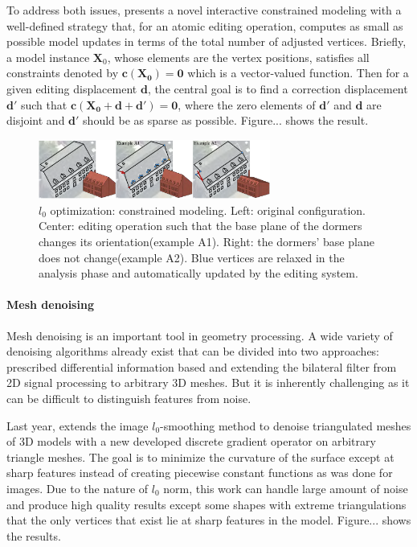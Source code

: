 To address both issues, \cite{habbecke2012linear} presents a novel interactive constrained modeling with a well-defined strategy that, for an atomic editing operation, computes as small as possible model updates in terms of the total number of adjusted vertices. Briefly, a model instance $\mathbf{X}_0$, whose elements are the vertex positions, satisfies all constraints denoted by $\mathbf{c(X_0)=0}$ which is a vector-valued function. Then for a given editing displacement $\mathbf{d}$, the central goal is to find a correction displacement $\mathbf{d'}$ such that $\mathbf{c(X_0+d+d')=0}$, where the zero elements of $\mathbf{d'}$ and $\mathbf{d}$ are disjoint and $\mathbf{d'}$ should be as sparse as possible. Figure... shows the result.

\begin{figure}[ht]
  \centering
  \includegraphics[width=3in]{images/modeling_L0}
  \caption{$l_0$ optimization: constrained modeling\cite{habbecke2012linear}. Left: original configuration. Center: editing operation such that the base plane of the dormers changes its orientation(example A1). Right: the dormers' base plane does not change(example A2). Blue vertices are relaxed in the analysis phase and automatically updated by the editing system.}
\end{figure}

\paragraph{Mesh denoising} Mesh denoising is an important tool in geometry processing. A wide variety of denoising algorithms already exist that can be divided into two approaches: prescribed differential information based and extending the bilateral filter from 2D signal processing to arbitrary 3D meshes. But it is inherently challenging as it can be difficult to distinguish features from noise.

Last year, \cite{he2013mesh} extends the image $l_0$-smoothing method\cite{xu2011image} to denoise triangulated meshes of 3D models with a new developed discrete gradient operator on arbitrary triangle meshes. The goal is to minimize the curvature of the surface except at sharp features instead of creating piecewise constant functions as was done for images. Due to the nature of $l_0$ norm, this work can handle large amount of noise and produce high quality results except some shapes with extreme triangulations that the only vertices that exist lie at sharp features in the model. Figure... shows the results.

